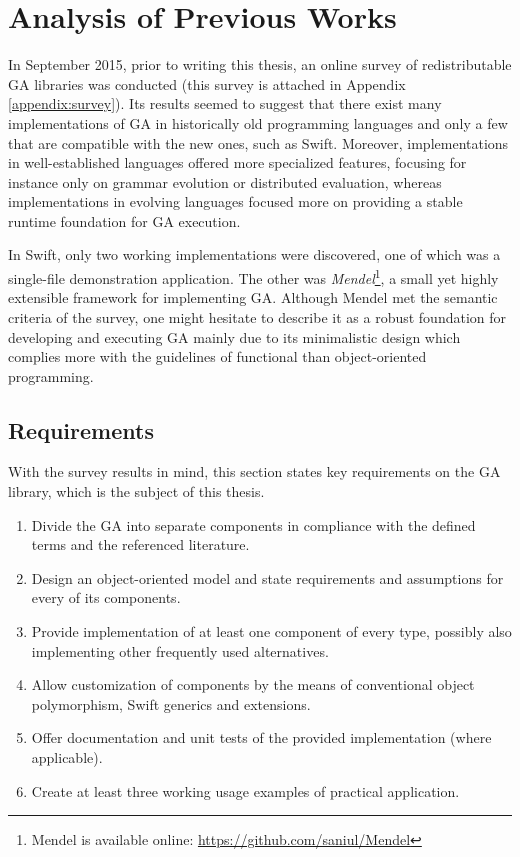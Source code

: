 \chapter{Analysis of Previous Works}
In September 2015, prior to writing this thesis, an online survey of redistributable GA libraries was conducted (this survey is attached in Appendix \ref{appendix:survey}). Its results seemed to suggest that there exist many implementations of GA in historically old programming languages and only a few that are compatible with the new ones, such as Swift. Moreover, implementations in well-established languages offered more specialized features, focusing for instance only on grammar evolution or distributed evaluation, whereas implementations in evolving languages focused more on providing a stable runtime foundation for GA execution.

In Swift, only two working implementations were discovered, one of which was a single-file demonstration application. The other was \textit{Mendel}\footnote{Mendel is available online: \url{https://github.com/saniul/Mendel}}, a small yet highly extensible framework for implementing GA. Although Mendel met the semantic criteria of the survey, one might hesitate to describe it as a robust foundation for developing and executing GA mainly due to its minimalistic design which complies more with the guidelines of functional than object-oriented programming.

\section{Requirements}
With the survey results in mind, this section states key requirements on the GA library, which is the subject of this thesis.
~
\begin{enumerate}
	\item
	Divide the GA into separate components in compliance with the defined terms and the referenced literature.

	\item
	Design an object-oriented model and state requirements and assumptions for every of its components.

	\item 
	Provide implementation of at least one component of every type, possibly also implementing other frequently used alternatives.

	\item 
	Allow customization of components by the means of conventional object polymorphism, Swift generics and extensions.

	\item
	Offer documentation and unit tests of the provided implementation (where applicable).

	\item
	Create at least three working usage examples of practical application.
\end{enumerate}
